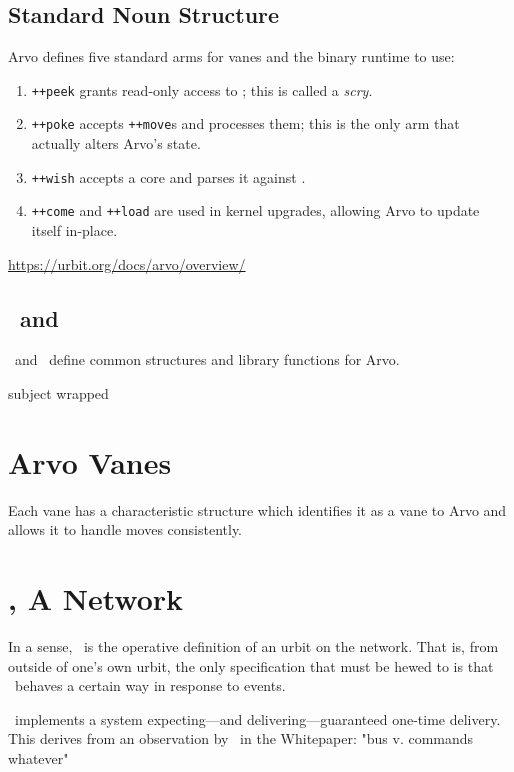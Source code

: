 \subsection{Standard Noun Structure}

Arvo defines five standard arms for vanes and the binary runtime to use:

\begin{enumerate}
  \item  \texttt{++peek} grants read-only access to \clay; this is called a \emph{scry}.
  \item  \texttt{++poke} accepts \texttt{++move}s and processes them; this is the only arm that actually alters Arvo's state.
  \item  \texttt{++wish} accepts a core and parses it against \zuse.
  \item  \texttt{++come} and \texttt{++load} are used in kernel upgrades, allowing Arvo to update itself in-place.
\end{enumerate}


\href{Arvo tutorial}{https://urbit.org/docs/arvo/overview/}

\subsection[\zuse~\&~\lull]{\zuse~and \lull}

\zuse~and \lull~define common structures and library functions for Arvo.

subject wrapped

\section{Arvo Vanes}

Each vane has a characteristic structure which identifies it as a vane to Arvo and allows it to handle moves consistently.

\section[\ames]{\ames, A Network}

In a sense, \ames~is the operative definition of an urbit on the network.  That is, from outside of one's own urbit, the only specification that must be hewed to is that \ames~behaves a certain way in response to events.

\ames~implements a system expecting—and delivering—guaranteed one-time delivery.  This derives from an observation by \citeauthor{Yarvin2016}~in the Whitepaper:  "bus v. commands whatever"

